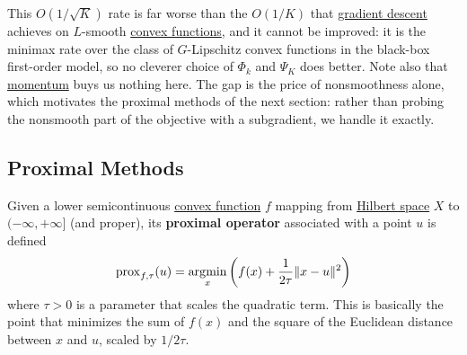 	This $O(1/\sqrt{K})$ rate is far worse than the $O(1/K)$ that \hyperref[def:gradient_descent]{gradient descent} achieves on $L$-smooth \hyperref[mt-def:convex-function]{convex functions}, and it cannot be improved: it is the minimax rate over the class of $G$-Lipschitz convex functions in the black-box first-order model, so no cleverer choice of $\Phi_k$ and $\Psi_K$ does better. Note also that \hyperref[def:gradient_descent_momentum]{momentum} buys us nothing here. The gap is the price of nonsmoothness alone, which motivates the proximal methods of the next section: rather than probing the nonsmooth part of the objective with a subgradient, we handle it exactly.

\subsection{Proximal Methods}

  \begin{definition}
    \label{def:proximal-operator}
    Given a lower semicontinuous \hyperref[mt-def:convex-function]{convex function} $f$ mapping from \hyperref[fa-def:hilbert-space]{Hilbert space} $X$ to $(-\infty, +\infty]$ (and proper), its \textbf{proximal operator} associated with a point $u$ is defined 
    \begin{equation}
      \operatorname{prox}_{f, \tau} (u) = \operatorname*{\arg\!\min}_{x} \bigg( f(x) + \frac{1}{2\tau} \|x - u\|^2 \bigg)
    \end{equation}
    where $\tau > 0$ is a parameter that scales the quadratic term. This is basically the point that minimizes the sum of $f(x)$ and the square of the Euclidean distance between $x$ and $u$, scaled by $1/2\tau$. 
  \end{definition}

